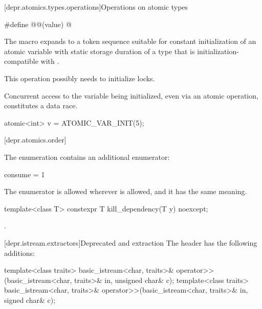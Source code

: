 [depr.atomics.types.operations]{Operations on atomic types}

%
\begin{itemdecl}
#define @@(value) @\seebelow@
\end{itemdecl}

\begin{itemdescr}
\pnum
The macro expands to a token sequence suitable for constant initialization of
an atomic variable with static storage duration of a type that
is initialization-compatible with .
\begin{note}
This operation possibly needs to initialize locks.
\end{note}
Concurrent access to the variable being initialized,
even via an atomic operation,
constitutes a data race.
\begin{example}
\begin{codeblock}
atomic<int> v = ATOMIC_VAR_INIT(5);
\end{codeblock}
\end{example}
\end{itemdescr}

[depr.atomics.order]{}

%
%
\pnum
The  enumeration contains an additional enumerator:
\begin{codeblock}
consume = 1
\end{codeblock}
The  enumerator is allowed wherever
 is allowed, and it has the same meaning.

\begin{itemdecl}
template<class T> constexpr T kill_dependency(T y) noexcept;
\end{itemdecl}

\begin{itemdescr}
\pnum
\returns
{}.
\end{itemdescr}

[depr.istream.extractors]{Deprecated  and  extraction}
\pnum
The header  has the following additions:

\begin{itemdecl}
template<class traits>
  basic_istream<char, traits>& operator>>(basic_istream<char, traits>& in, unsigned char& c);
template<class traits>
  basic_istream<char, traits>& operator>>(basic_istream<char, traits>& in, signed char& c);
\end{itemdecl}

